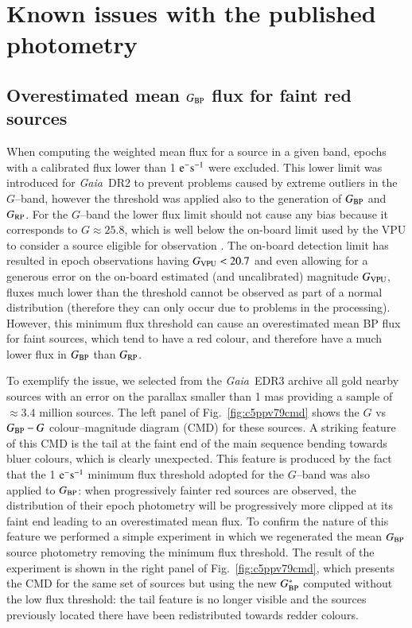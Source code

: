 \documentclass{aa}
\newcommand{\gaia}{\textit{Gaia}\xspace}
\newcommand{\gband}{$G$--band\xspace}
\newcommand{\gbp}{\ensuremath{G_{\rm BP}}\xspace}
\newcommand{\grp}{\ensuremath{G_{\rm RP}}\xspace}
\newcommand{\drt}{\gaia~DR2\xspace}
\newcommand{\edr}{\gaia~EDR3\xspace}
\newcommand{\figref}[1]{Fig.~\ref{fig:#1}}
\begin{document}
\section{Known issues with the published photometry}

\subsection{Overestimated mean \gbp flux for faint red sources}\label{sec:fluxlimit}

When computing the weighted mean flux for a source in a given band, epochs with a calibrated flux lower than 1 ${\rm e}^-{\rm s}^{-1}$ were excluded. This lower limit was introduced for \drt \citep{Proc_DR2} to prevent problems caused by extreme outliers in the \gband, however the threshold was applied also to the generation of \gbp and \grp. For the \gband the lower flux limit should not cause any bias because it corresponds to $G\approx25.8$, which is well below the on-board limit used by the VPU to consider a source eligible for observation \citep{VpuDetection}. The on-board detection limit has resulted in epoch observations having $G_{\rm VPU}<20.7$ and even allowing for a generous error on the on-board estimated (and uncalibrated) magnitude $G_{\rm VPU}$, fluxes much lower than the threshold cannot be observed as part of a normal distribution (therefore they can only occur due to problems in the processing). However, this minimum flux threshold can cause an overestimated mean BP flux for faint sources, which tend to have a red colour, and therefore have a much lower flux in \gbp than \grp.

To exemplify the issue, we selected from the \edr archive all gold nearby sources with an error on the parallax smaller than 1 mas providing a sample of $\approx3.4$ million sources. The left panel of \figref{c5ppv79cmd} shows the $G$ vs $\gbp-G$ colour--magnitude diagram (CMD) for these sources. A striking feature of this CMD is the tail at the faint end of the main sequence bending towards bluer colours, which is clearly unexpected. This feature is produced by the fact that the 1 ${\rm e}^-{\rm s}^{-1}$ minimum flux threshold adopted for the \gband was also applied to \gbp: when progressively fainter red sources are observed, the distribution of their epoch photometry will be progressively more clipped at its faint end leading to an overestimated mean flux. To confirm the nature of this feature we performed a simple experiment in which we regenerated the mean \gbp source photometry removing the minimum flux threshold. The result of the experiment is shown in the right panel of \figref{c5ppv79cmd}, which presents the CMD for the same set of sources but using the new $\gbp^{\ast}$ computed without the low flux threshold: the tail feature is no longer visible and the sources previously located there have been redistributed towards redder colours.
\end{document}
